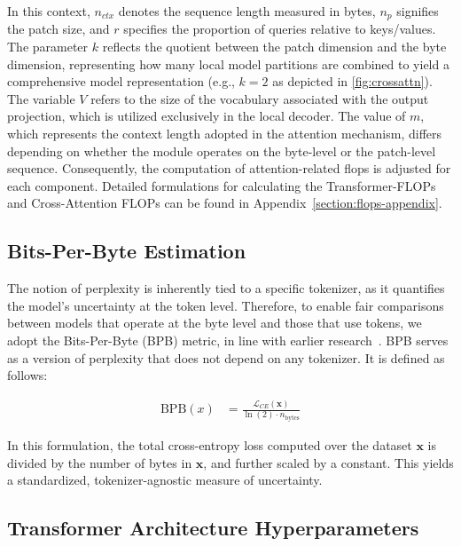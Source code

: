 In this context, $n_{ctx}$ denotes the sequence length measured in bytes, $n_p$ signifies the patch size, and $r$ specifies the proportion of queries relative to keys/values. The parameter $k$ reflects the quotient between the patch dimension and the byte dimension, representing how many local model partitions are combined to yield a comprehensive model representation (e.g., $k=2$ as depicted in \autoref{fig:crossattn}). The variable $V$ refers to the size of the vocabulary associated with the output projection, which is utilized exclusively in the local decoder. The value of $m$, which represents the context length adopted in the attention mechanism, differs depending on whether the module operates on the byte-level or the patch-level sequence. Consequently, the computation of attention-related flops is adjusted for each component. Detailed formulations for calculating the Transformer-FLOPs and Cross-Attention FLOPs can be found in Appendix~\ref{section:flops-appendix}.

\subsection{Bits-Per-Byte Estimation} The notion of perplexity is inherently tied to a specific tokenizer, as it quantifies the model’s uncertainty at the token level. Therefore, to enable fair comparisons between models that operate at the byte level and those that use tokens, we adopt the Bits-Per-Byte (BPB) metric, in line with earlier research~\citep{xue2022byt5, yu2023megabyte, wang2024mambabyte}. BPB serves as a version of perplexity that does not depend on any tokenizer. It is defined as follows:

\begin{align}
    \text{BPB}(x)&= \frac{\mathcal{L}_{CE}(\pmb{x})}{\ln(2)\cdot n_{\text{bytes}}}
\end{align}

In this formulation, the total cross-entropy loss computed over the dataset $\pmb{x}$ is divided by the number of bytes in $\pmb{x}$, and further scaled by a constant. This yields a standardized, tokenizer-agnostic measure of uncertainty.

\subsection{Transformer Architecture Hyperparameters} 


